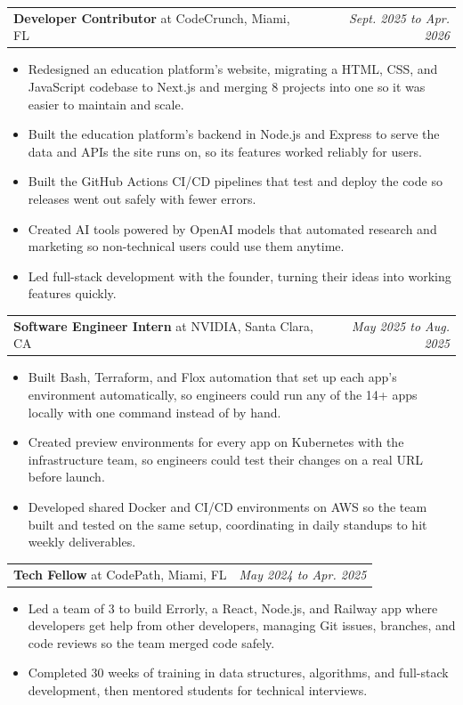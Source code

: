 \documentclass[letterpaper]{article}
\makeatletter
\newcommand{\entry}[3]{%
  \vspace{4pt}\needspace{4\baselineskip}
  \begin{tabular*}{\textwidth}{@{}l@{\extracolsep{\fill}}r@{}}
    \textbf{#1}#2 & \textit{#3} \\
  \end{tabular*}\par\vspace{1pt}}
\makeatother
\begin{document}
\entry{Developer Contributor}{ at CodeCrunch, Miami, FL}{Sept. 2025 to Apr. 2026}
\begin{itemize}
  \item Redesigned an education platform's website, migrating a HTML, CSS, and JavaScript codebase to Next.js and merging 8 projects into one so it was easier to maintain and scale.
  \item Built the education platform's backend in Node.js and Express to serve the data and APIs the site runs on, so its features worked reliably for users.
  \item Built the GitHub Actions CI/CD pipelines that test and deploy the code so releases went out safely with fewer errors.
  \item Created AI tools powered by OpenAI models that automated research and marketing so non-technical users could use them anytime.
  \item Led full-stack development with the founder, turning their ideas into working features quickly.
\end{itemize}

\entry{Software Engineer Intern}{ at NVIDIA, Santa Clara, CA}{May 2025 to Aug. 2025}
\begin{itemize}
  \item Built Bash, Terraform, and Flox automation that set up each app's environment automatically, so engineers could run any of the 14+ apps locally with one command instead of by hand.
  \item Created preview environments for every app on Kubernetes with the infrastructure team, so engineers could test their changes on a real URL before launch.
  \item Developed shared Docker and CI/CD environments on AWS so the team built and tested on the same setup, coordinating in daily standups to hit weekly deliverables.
\end{itemize}

\entry{Tech Fellow}{ at CodePath, Miami, FL}{May 2024 to Apr. 2025}
\begin{itemize}
  \item Led a team of 3 to build Errorly, a React, Node.js, and Railway app where developers get help from other developers, managing Git issues, branches, and code reviews so the team merged code safely.
  \item Completed 30 weeks of training in data structures, algorithms, and full-stack development, then mentored students for technical interviews.
\end{itemize}
\end{document}
